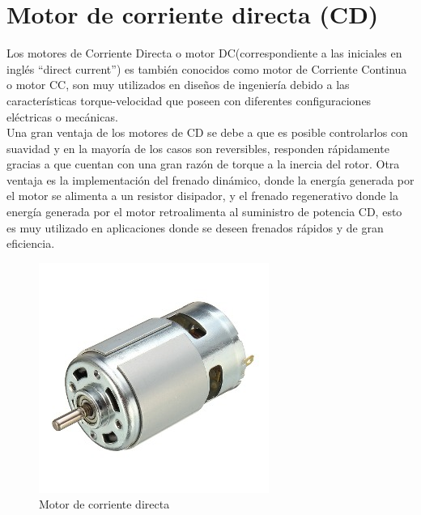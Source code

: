 \documentclass[12pt,a4paper]{article}
\begin{document}
\section*{Motor de corriente directa (CD)}
Los motores de Corriente Directa o motor DC(correspondiente a las iniciales en inglés “direct current”) es también conocidos como motor de Corriente Continua o motor CC, son  muy utilizados en diseños de ingeniería debido a las características torque-velocidad que poseen con diferentes configuraciones eléctricas o mecánicas.\\
Una gran ventaja de los motores de CD se debe a que es posible controlarlos con suavidad y en la mayoría de los casos son reversibles, responden rápidamente gracias a que cuentan con una gran razón de torque a la inercia del rotor. Otra ventaja es la implementación del frenado dinámico, donde la energía generada por el motor se alimenta a un resistor disipador, y el frenado regenerativo donde la energía generada por el motor retroalimenta al suministro de potencia CD, esto es muy utilizado en aplicaciones donde se deseen frenados rápidos y de gran eficiencia.
\begin{figure}[hbtp]
\centering
\includegraphics[scale=0.6]{Circuitos/Motor.jpg}
\caption{Motor de corriente directa}
\end{figure}
\end{document}
